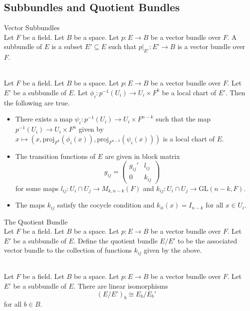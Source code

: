 \documentclass[a4paper]{article}
\begin{document}
\subsection{Subbundles and Quotient Bundles}
\begin{defn}{Vector Subbundles}{}\\
Let $F$ be a field. Let $B$ be a space. Let $p:E\to B$ be a vector bundle over $F$. A subbundle of $E$ is a subset $E'\subseteq E$ such that $p|_{E'}:E'\to B$ is a vector bundle over $F$. 
\end{defn}

\begin{lmm}{}{}\\
Let $F$ be a field. Let $B$ be a space. Let $p:E\to B$ be a vector bundle over $F$. Let $E'$ be a subbundle of $E$. Let $\phi_i:p^{-1}(U_i)\to U_i\times F^k$ be a local chart of $E'$. Then the following are true. 
\begin{itemize}
\item There exists a map $\psi_i:p^{-1}(U_i)\to U_i\times F^{n-k}$ such that the map $p^{-1}(U_i)\to U_i\times F^n$ given by $x\mapsto(x,\text{proj}_{F^k}(\phi_i(x)),\text{proj}_{F^{n-k}}(\psi_i(x)))$ is a local chart of $E$. 
\item The transition functions of $E$ are given in block matrix $$g_{ij}=\begin{pmatrix}
g_{ij}' & l_{ij}\\
0 & k_{ij}
\end{pmatrix}$$
for some maps $l_{ij}:U_i\cap U_j\to M_{k,n-k}(F)$ and $k_{ij}:U_i\cap U_j\to\text{GL}(n-k,F)$. 
\item The maps $k_{ij}$ satisfy the cocycle condition and $k_{ii}(x)=I_{n-k}$ for all $x\in U_i$. 
\end{itemize}
\end{lmm}

\begin{defn}{The Quotient Bundle}{}\\
Let $F$ be a field. Let $B$ be a space. Let $p:E\to B$ be a vector bundle over $F$. Let $E'$ be a subbundle of $E$. Define the quotient bundle $E/E'$ to be the associated vector bundle to the collection of functions $k_{ij}$ given by the above. 
\end{defn}

\begin{lmm}{}{}\\
Let $F$ be a field. Let $B$ be a space. Let $p:E\to B$ be a vector bundle over $F$. Let $E'$ be a subbundle of $E$. There are linear isomorphisms $$(E/E')_b\cong E_b/E_b'$$ for all $b\in B$. 
\end{lmm}
\end{document}
